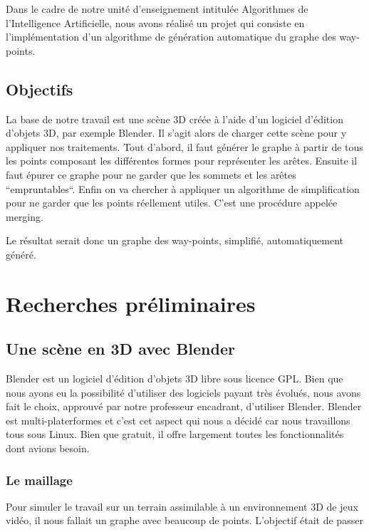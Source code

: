 \documentclass[a4paper,12pt]{report}
\begin{document}
Dans le cadre de notre unité d'enseignement intitulée Algorithmes de l'Intelligence Artificielle, nous avons réalisé un projet qui consiste en l'implémentation d'un algorithme de génération automatique du graphe des way-points.


\section*{Objectifs}

La base de notre travail est une scène 3D créée à l'aide d'un logiciel d'édition d'objets 3D, par exemple Blender. Il s'agit alors de charger cette scène pour y appliquer nos traitements. Tout d'abord, il faut générer le graphe à partir de tous les points composant les différentes formes pour représenter les arêtes. Ensuite il faut épurer ce graphe pour ne garder que les sommets et les arêtes ``empruntables``. Enfin on va chercher à appliquer un algorithme de simplification pour ne garder que les points réellement utiles. C'est une procédure appelée merging.

Le résultat serait donc un graphe des way-points, simplifié, automatiquement généré.

\chapter{Recherches préliminaires}

\section{Une scène en 3D avec Blender}

Blender est un logiciel d'édition d'objets 3D libre sous licence GPL. Bien que nous ayons eu la possibilité d'utiliser des logiciels payant très évolués, nous avons fait le choix, approuvé par notre professeur encadrant, d'utiliser Blender. Blender est multi-platerformes et c'est cet aspect qui nous a décidé car nous travaillons tous sous Linux. Bien que gratuit, il offre largement toutes les fonctionnalités dont avions besoin.

\subsection{Le maillage}

Pour simuler le travail sur un terrain assimilable à un environnement 3D de jeux vidéo, il nous fallait un graphe avec beaucoup de points. L'objectif était de passer 
\end{document}
